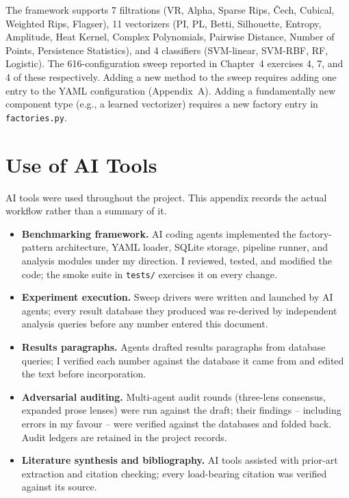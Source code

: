 \documentclass[12pt, a4paper]{report}
\theoremstyle{definition}
\theoremstyle{plain}
\theoremstyle{remark}
\begin{document}
The framework supports 7 filtrations (VR, Alpha, Sparse Rips, \v{C}ech,
Cubical, Weighted Rips, Flagser), 11 vectorizers (PI, PL, Betti,
Silhouette, Entropy, Amplitude, Heat Kernel, Complex Polynomials,
Pairwise Distance, Number of Points, Persistence Statistics), and
4 classifiers (SVM-linear, SVM-RBF, RF, Logistic). The 616-configuration
sweep reported in Chapter~4 exercises 4, 7, and 4 of these
respectively. Adding a new method to the sweep requires adding one
entry to the YAML configuration (Appendix~A). Adding a fundamentally
new component type (e.g., a learned vectorizer) requires a new
factory entry in \texttt{factories.py}.

\newpage

\chapter{Use of AI Tools}
\label{app:ai}

AI tools were used throughout the project. This appendix records
the actual workflow rather than a summary of it.

\begin{itemize}
  \item \textbf{Benchmarking framework.} AI coding agents
    implemented the factory-pattern architecture, YAML loader,
    SQLite storage, pipeline runner, and analysis modules under my
    direction. I reviewed, tested, and modified the code; the smoke
    suite in \texttt{tests/} exercises it on every change.
  \item \textbf{Experiment execution.} Sweep drivers were written
    and launched by AI agents; every result database they produced
    was re-derived by independent analysis queries before any number
    entered this document.
  \item \textbf{Results paragraphs.} Agents drafted results
    paragraphs from database queries; I verified each number against
    the database it came from and edited the text before
    incorporation.
  \item \textbf{Adversarial auditing.} Multi-agent audit rounds
    (three-lens consensus, expanded prose lenses) were run against
    the draft; their findings -- including errors in my favour --
    were verified against the databases and folded back. Audit
    ledgers are retained in the project records.
  \item \textbf{Literature synthesis and bibliography.} AI tools
    assisted with prior-art extraction and citation checking; every
    load-bearing citation was verified against its source.
\end{itemize}
\end{document}
